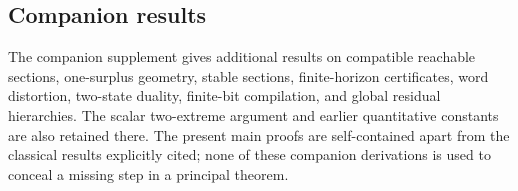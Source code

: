 \subsection{Companion results}
The companion supplement gives additional results on compatible reachable sections, one-surplus geometry, stable sections, finite-horizon certificates, word distortion, two-state duality, finite-bit compilation, and global residual hierarchies. The scalar two-extreme argument and earlier quantitative constants are also retained there. The present main proofs are self-contained apart from the classical results explicitly cited; none of these companion derivations is used to conceal a missing step in a principal theorem.
